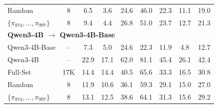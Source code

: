 \begin{table}[t!]
{\begin{tabular}{lcccccccc}
\midrule
Random & 8 & 6.5 & 3.6 & 24.6 & 46.0 & 22.3 & 11.1 & 19.0 \\
$\{\pi_{874}, \dots, \pi_{997}\}$ & 8 & 9.4 & 4.4 & 26.8 & 51.0 & 23.7 & 12.7 & 21.3 \\
\midrule
\midrule
\multicolumn{9}{l}{\textbf{Qwen3-4B $\rightarrow$ Qwen3-4B-Base}} \\
\midrule
\midrule
Qwen3-4B-Base & -- & 7.3 & 5.0 & 24.6 & 22.3 & 11.9 & 4.8 & 12.7 \\
Qwen3-4B & -- & 22.9 & 17.1 & 62.0 & 81.1 & 45.4 & 26.1 & 42.4 \\
\midrule
Full-Set & 17K & 14.4 & 14.4 & 40.5 & 65.6 & 33.3 & 16.5 & 30.8 \\
\midrule
Random & 8 & 11.9 & 10.6 & 36.1 & 59.3 & 29.1 & 15.0 & 27.0 \\
$\{\pi_{874}, \dots, \pi_{997}\}$ & 8 & 13.1 & 12.5 & 38.6 & 64.1 & 31.3 & 15.6 & 29.2 \\
\bottomrule
\end{tabular}}
\end{table}